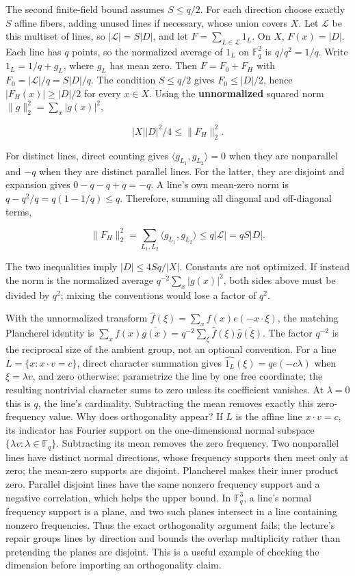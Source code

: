 The second finite-field bound assumes \(S\le q/2\). For each direction choose exactly \(S\) affine fibers, adding unused lines if necessary, whose union covers \(X\). Let \(\mathcal L\) be this multiset of lines, so \(|\mathcal L|=S|D|\), and let \(F=\sum_{L\in\mathcal L}1_L\). On \(X\), \(F(x)=|D|\). Each line has \(q\) points, so the normalized average of \(1_L\) on \(\mathbb F_q^2\) is \(q/q^2=1/q\). Write \(1_L=1/q+g_L\), where \(g_L\) has mean zero. Then \(F=F_0+F_H\) with \(F_0=|\mathcal L|/q=S|D|/q\). The condition \(S\le q/2\) gives \(F_0\le |D|/2\), hence \(|F_H(x)|\ge |D|/2\) for every \(x\in X\). Using the \textbf{unnormalized} squared norm \(\|g\|_2^2=\sum_x|g(x)|^2\),

\[|X||D|^2/4\le \|F_H\|_2^2.\]

For distinct lines, direct counting gives \(\langle g_{L_1},g_{L_2}\rangle=0\) when they are nonparallel and \(-q\) when they are distinct parallel lines. For the latter, they are disjoint and expansion gives \(0-q-q+q=-q\). A line's own mean-zero norm is \(q-q^2/q=q(1-1/q)\le q\). Therefore, summing all diagonal and off-diagonal terms,

\[\|F_H\|_2^2=\sum_{L_1,L_2}\langle g_{L_1},g_{L_2}\rangle\le q|\mathcal L|=qS|D|.\]

The two inequalities imply \(|D|\le 4Sq/|X|\). Constants are not optimized. If instead the norm is the normalized average \(q^{-2}\sum_x|g(x)|^2\), both sides above must be divided by \(q^2\); mixing the conventions would lose a factor of \(q^2\).

With the unnormalized transform \(\widehat f(\xi)=\sum_x f(x)e(-x\cdot\xi)\), the matching Plancherel identity is \(\sum_x f(x)\overline{g(x)}=q^{-2}\sum_\xi\widehat f(\xi)\overline{\widehat g(\xi)}\). The factor \(q^{-2}\) is the reciprocal size of the ambient group, not an optional convention. For a line \(L=\{x:x\cdot v=c\}\), direct character summation gives \(\widehat{1_L}(\xi)=q e(-c\lambda)\) when \(\xi=\lambda v\), and zero otherwise: parametrize the line by one free coordinate; the resulting nontrivial character sums to zero unless its coefficient vanishes. At \(\lambda=0\) this is \(q\), the line's cardinality. Subtracting the mean removes exactly this zero-frequency value. Why does orthogonality appear? If \(L\) is the affine line \(x\cdot v=c\), its indicator has Fourier support on the one-dimensional normal subspace \(\{\lambda v:\lambda\in\mathbb F_q\}\). Subtracting its mean removes the zero frequency. Two nonparallel lines have distinct normal directions, whose frequency supports then meet only at zero; the mean-zero supports are disjoint. Plancherel makes their inner product zero. Parallel disjoint lines have the same nonzero frequency support and a negative correlation, which helps the upper bound. In \(\mathbb F_q^3\), a line's normal frequency support is a plane, and two such planes intersect in a line containing nonzero frequencies. Thus the exact orthogonality argument fails; the lecture's repair groups lines by direction and bounds the overlap multiplicity rather than pretending the planes are disjoint. This is a useful example of checking the dimension before importing an orthogonality claim.


